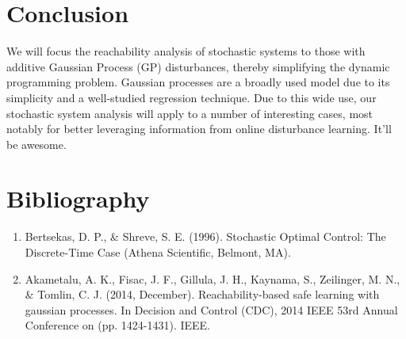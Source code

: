 \documentclass[a4paper]{article}
\begin{document}
\section{Conclusion}
We will focus the reachability analysis of stochastic systems to those with additive Gaussian Process (GP) disturbances, thereby simplifying the dynamic programming problem.
Gaussian processes are a broadly used model due to its simplicity and a well-studied regression technique.
Due to this wide use, our stochastic system analysis will apply to a number of interesting cases, most notably for better leveraging information from online disturbance learning.
It'll be awesome.

\section{Bibliography}
\begin{enumerate}
\item Bertsekas, D. P., \& Shreve, S. E. (1996). Stochastic Optimal Control: The Discrete-Time Case (Athena Scientific, Belmont, MA).

\item Akametalu, A. K., Fisac, J. F., Gillula, J. H., Kaynama, S., Zeilinger, M. N., \& Tomlin, C. J. (2014, December). Reachability-based safe learning with gaussian processes. In Decision and Control (CDC), 2014 IEEE 53rd Annual Conference on (pp. 1424-1431). IEEE.
\end{enumerate}
\end{document}

